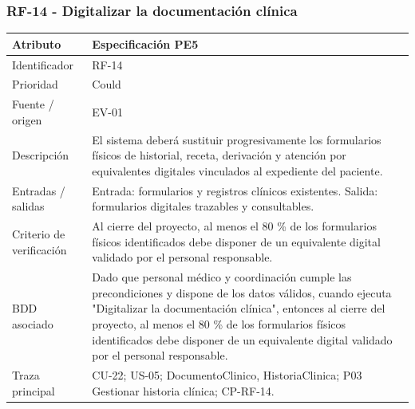 \documentclass[11pt,a4paper]{article}
\begin{document}
	\subsubsection{RF-14 - Digitalizar la documentación clínica}
	\begin{tabularx}{\textwidth}{p{3.2cm}Y}
		\toprule
		\textbf{Atributo} & \textbf{Especificación PE5}\\\midrule
		Identificador & RF-14\\
		Prioridad & Could\\
		Fuente / origen & EV-01\\
		Descripción & El sistema deberá sustituir progresivamente los formularios físicos de historial, receta, derivación y atención por equivalentes digitales vinculados al expediente del paciente.\\
		Entradas / salidas & Entrada: formularios y registros clínicos existentes. Salida: formularios digitales trazables y consultables.\\
		Criterio de verificación & Al cierre del proyecto, al menos el 80 \% de los formularios físicos identificados debe disponer de un equivalente digital validado por el personal responsable.\\
		BDD asociado & Dado que personal médico y coordinación cumple las precondiciones y dispone de los datos válidos, cuando ejecuta "Digitalizar la documentación clínica", entonces al cierre del proyecto, al menos el 80 \% de los formularios físicos identificados debe disponer de un equivalente digital validado por el personal responsable.\\
		Traza principal & CU-22; US-05; DocumentoClinico, HistoriaClinica; P03 Gestionar historia clínica; CP-RF-14.\\
		\bottomrule
	\end{tabularx}
	\clearpage
\end{document}
